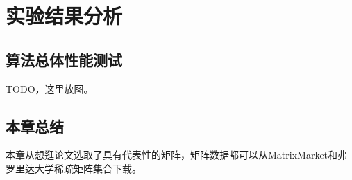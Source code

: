\chapter{实验结果分析}
\section{算法总体性能测试}

TODO，这里放图。

\section{本章总结}

本章从想逛论文选取了具有代表性的矩阵，矩阵数据都可以从MatrixMarket和弗罗里达大学稀疏矩阵集合下载。



\endinput